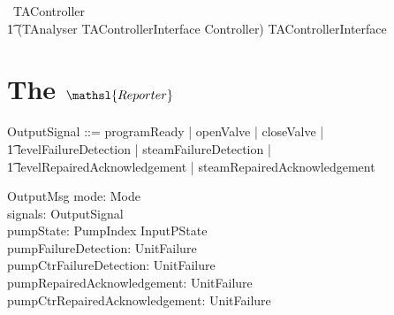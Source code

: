 \documentclass{report} %
\begin{document}
\begin{circus}
   \circprocess\ TAController \circdef \\
    \t1 (TAnalyser \lpar TAControllerInterface \rpar Controller) \circhide TAControllerInterface
\end{circus}


\chapter{The $\mathsl{Reporter}$}

\begin{zed}
  OutputSignal ::= programReady  | openValve | closeValve | \\
      \t1 levelFailureDetection | steamFailureDetection | \\
      \t1 levelRepairedAcknowledgement | steamRepairedAcknowledgement
\end{zed}

\begin{schema}{OutputMsg}
  mode: Mode
  \\ %
  signals: \power OutputSignal
  \\ %
  pumpState: PumpIndex \fun InputPState
  \\ %
  pumpFailureDetection: \power UnitFailure 
  \\ %
  pumpCtrFailureDetection: \power UnitFailure 
  \\ %
  pumpRepairedAcknowledgement: \power UnitFailure 
  \\ %
  pumpCtrRepairedAcknowledgement: \power UnitFailure 
\end{schema}
\end{document}
